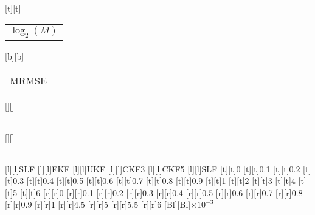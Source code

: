 %    
%
%
%
[t][t]{\color[rgb]{0,0,0}\setlength{\tabcolsep}{0pt}\begin{tabular}{c}$\log_2 (M)$\end{tabular}}%
[b][b]{\color[rgb]{0,0,0}\setlength{\tabcolsep}{0pt}\begin{tabular}{c}MRMSE\end{tabular}}%
[][]{\color[rgb]{0,0,0}\setlength{\tabcolsep}{0pt}\begin{tabular}{c} \end{tabular}}%
[][]{\color[rgb]{0,0,0}\setlength{\tabcolsep}{0pt}\begin{tabular}{c} \end{tabular}}%
[l][l]{\color[rgb]{0,0,0}SLF}%
[l][l]{\color[rgb]{0,0,0}EKF}%
[l][l]{\color[rgb]{0,0,0}UKF}%
[l][l]{\color[rgb]{0,0,0}CKF3}%
[l][l]{\color[rgb]{0,0,0}CKF5}%
[l][l]{\color[rgb]{0,0,0}SLF}%
%
[t][t]{0}%
[t][t]{0.1}%
[t][t]{0.2}%
[t][t]{0.3}%
[t][t]{0.4}%
[t][t]{0.5}%
[t][t]{0.6}%
[t][t]{0.7}%
[t][t]{0.8}%
[t][t]{0.9}%
[t][t]{1}%
[t][t]{2}%
[t][t]{3}%
[t][t]{4}%
[t][t]{5}%
[t][t]{6}%
%
[r][r]{0}%
[r][r]{0.1}%
[r][r]{0.2}%
[r][r]{0.3}%
[r][r]{0.4}%
[r][r]{0.5}%
[r][r]{0.6}%
[r][r]{0.7}%
[r][r]{0.8}%
[r][r]{0.9}%
[r][r]{1}%
[r][r]{4.5}%
[r][r]{5}%
[r][r]{5.5}%
[r][r]{6}%
[Bl][Bl]{$\times 10^{-3}$}%
%
%
